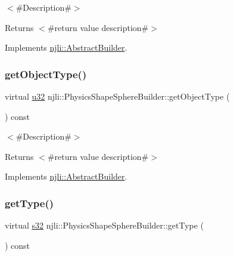 $<$\#\+Description\#$>$

\begin{DoxyReturn}{Returns}
$<$\#return value description\#$>$ 
\end{DoxyReturn}


Implements \mbox{\hyperlink{classnjli_1_1_abstract_builder_a902f73ea78031b06aca183a417f3413b}{njli\+::\+Abstract\+Builder}}.

\mbox{\label{classnjli_1_1_physics_shape_sphere_builder_a4ef436a6125f40dc3121b35d0c998180}} 
\subsubsection{\texorpdfstring{get\+Object\+Type()}{getObjectType()}}
{\footnotesize\ttfamily virtual \mbox{\hyperlink{_util_8h_a10e94b422ef0c20dcdec20d31a1f5049}{u32}} njli\+::\+Physics\+Shape\+Sphere\+Builder\+::get\+Object\+Type (\begin{DoxyParamCaption}{ }\end{DoxyParamCaption}) const\hspace{0.3cm}{\ttfamily [virtual]}}

$<$\#\+Description\#$>$

\begin{DoxyReturn}{Returns}
$<$\#return value description\#$>$ 
\end{DoxyReturn}


Implements \mbox{\hyperlink{classnjli_1_1_abstract_builder_a0f2d344fcf697b167f4f2b1122b5fb33}{njli\+::\+Abstract\+Builder}}.

\mbox{\label{classnjli_1_1_physics_shape_sphere_builder_a99a7b9eaeabaccc78559b6baf09601d1}} 
\subsubsection{\texorpdfstring{get\+Type()}{getType()}}
{\footnotesize\ttfamily virtual \mbox{\hyperlink{_util_8h_aa62c75d314a0d1f37f79c4b73b2292e2}{s32}} njli\+::\+Physics\+Shape\+Sphere\+Builder\+::get\+Type (\begin{DoxyParamCaption}{ }\end{DoxyParamCaption}) const\hspace{0.3cm}{\ttfamily [virtual]}}


